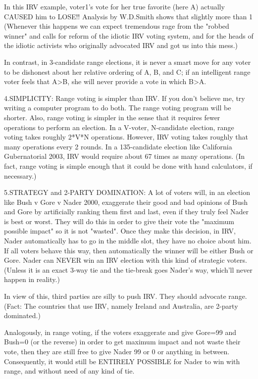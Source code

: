 In this IRV example, voter1's vote for her true favorite (here A)
actually CAUSED him to LOSE!!  Analysis by W.D.Smith shows that 
slightly more than 1%
(Whenever this happens we can expect tremendous rage from the "robbed
winner" and calls for reform of the idiotic IRV voting system, and for the
heads of the idiotic activists who originally advocated IRV and got us into this mess.)

In contrast, in 3-candidate range elections, it is never a smart move
for any voter to be dishonest about her relative ordering of A, B, and C;
if an intelligent range voter feels that A>B, she will never provide
a vote in which B>A.

4.SIMPLICITY:
Range voting is simpler than IRV.
If you don't believe me, try writing a computer program to do both.
The range voting program will be shorter.
Also, range voting is simpler in the sense that it requires fewer operations
to perform an election.  In a V-voter, N-candidate election,
range voting takes roughly 2*V*N operations.  However, IRV voting
takes roughly that many operations every 2 rounds.  In a 135-candidate
election like California Gubernatorial 2003, IRV would require about 67 times
as many operations.  (In fact, range voting is simple enough that it could
be done with hand calculators, if necessary.)

5.STRATEGY and 2-PARTY DOMINATION:
A lot of voters will, in an election like Bush v Gore v Nader 2000,
exaggerate their good and bad opinions of Bush and Gore by artificially ranking
them first and last, even if they truly feel Nader is best or worst.
They will do this in order to give their vote the "maximum possible impact"
so it is not "wasted".  Once they make this decision, in IRV, Nader automatically
has to go in the middle slot, they have no choice about him.  If all
voters behave this way, then automatically the winner will be either
Bush or Gore.  Nader can NEVER win an IRV election with this kind of strategic voters.
(Unless it is an exact 3-way tie and the tie-break goes Nader's way,
which'll never happen in reality.)

In view of this, third parties are silly to push IRV.  They should advocate range.
(Fact: The countries that use IRV, namely Ireland and Australia, are 2-party dominated.)

Analogously, in range voting, if the voters exaggerate and give Gore=99 and Bush=0 
(or the reverse) in order to get maximum impact and not waste their vote, then 
they are still free to give Nader 99 or 0 or anything in between.
Consequently, it would still be ENTIRELY POSSIBLE for Nader to win with range,
and without need of any kind of tie.

